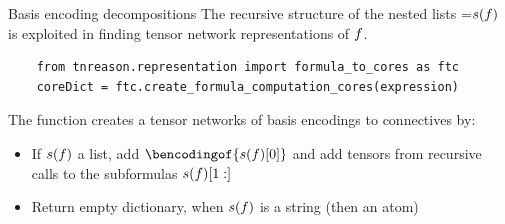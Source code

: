 \documentclass{beamer}
\begin{document}
    \begin{frame}[fragile]{Basis encoding decompositions}
        The recursive structure of the nested lists =$s(f)$ is exploited in finding tensor network representations of $f$.
        \begin{verbatim}
    from tnreason.representation import formula_to_cores as ftc
    coreDict = ftc.create_formula_computation_cores(expression)
        \end{verbatim}
        The function creates a tensor networks of basis encodings to connectives by:
        \begin{itemize}
            \item If $s(f)$ a list, add $\bencodingof{\scriptrepof{\exformula}[0]}$ and add tensors from recursive calls to the subformulas $s(f)[1:]$
            \item Return empty dictionary, when $s(f)$ is a string (then an atom)
        \end{itemize}
    \end{frame}
\end{document}
